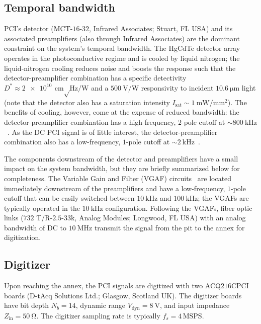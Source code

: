 \subsection{Temporal bandwidth}
\label{sec:Implementation:PCI:temporal_bandwidth}
PCI's detector ({MCT-$16$-$32$}, Infrared Associates; Stuart, FL USA) and
its associated preamplifiers (also through Infrared Associates)
are the dominant constraint on the system's temporal bandwidth.
The HgCdTe detector array
operates in the photoconductive regime and
is cooled by liquid nitrogen;
the liquid-nitrogen cooling reduces noise and boosts the response such that
the detector-preamplifier combination has
a specific detectivity
$D^* \approx \SI{2e10}{\centi\meter \sqrt\hertz \per\watt}$ and
a $\SI{500}{\volt\per\watt}$ responsivity
to incident $\SI{10.6}{\micro\meter}$ light
(note that the detector also has a saturation intensity
$I_{\text{sat}} \sim \SI{1}{\milli\watt \per\milli\meter\squared}$).
The benefits of cooling, however, come at the expense of reduced bandwidth:
the detector-preamplifier combination has
a high-frequency, $2$-pole cutoff
at $\sim \SI{800}{\kilo\hertz}$~\cite{rost_pci_detector_response}.
As the DC PCI signal is of little interest,
the detector-preamplifier combination also has
a low-frequency, $1$-pole cutoff
at $\sim \SI{2}{\kilo\hertz}$~\cite{rost_pci_detector_response}.

The components downstream of the detector and preamplifiers
have a small impact on the system bandwidth, but
they are briefly summarized below for completeness.
The Variable Gain and Filter (VGAF) circuits~\cite[Sec.~3.3.3]{dorris_phd}
are located immediately downstream of the preamplifiers and
have a low-frequency, $1$-pole cutoff that can be easily switched between
$\SI{10}{\kilo\hertz}$ and $\SI{100}{\kilo\hertz}$;
the VGAFs are typically operated in the $\SI{10}{\kilo\hertz}$ configuration.
Following the VGAFs,
fiber optic links ({$732$ T/R-$2.5$-$33$k}, Analog Modules; Longwood, FL USA)
with an analog bandwidth of DC to $\SI{10}{\mega\hertz}$
transmit the signal from the \diiid\space pit to the annex for digitization.


\subsection{Digitizer}
\label{sec:Implementation:PCI:digitizer}
Upon reaching the annex,
the PCI signals are digitized with two
{ACQ$216$CPCI} boards (D-tAcq Solutions Ltd.; Glasgow, Scotland UK).
The digitizer boards have bit depth $N_b = 14$,
dynamic range $V_{\text{dyn}} = \SI{8}{\volt}$, and
input impedance $Z_{\text{in}} = \SI{50}{\ohm}$.
The digitizer sampling rate is typically $f_s = 4 \, \text{MSPS}$.


